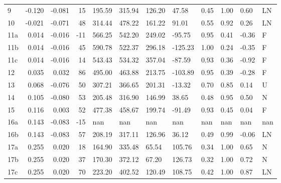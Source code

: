 \begin{tabular}{lrrrllllllll}
    9 & -0.120 & -0.081 &   15 &      195.59 &      315.94 &       126.20 &         47.58 &           0.45 &         1.00 &    0.60 &          LN \\
   10 & -0.021 & -0.071 &   48 &      314.44 &      478.22 &       161.22 &         91.01 &           0.55 &         0.92 &    0.26 &          LN \\
  11a &  0.014 & -0.016 &  -11 &      566.25 &      542.20 &       249.02 &        -95.75 &           0.95 &         0.41 &   -0.36 &           F \\
  11b &  0.014 & -0.016 &   45 &      590.78 &      522.37 &       296.18 &       -125.23 &           1.00 &         0.24 &   -0.35 &           F \\
  11c &  0.014 & -0.016 &   14 &      543.43 &      534.32 &       357.04 &        -87.59 &           0.93 &         0.36 &   -0.92 &           F \\
   12 &  0.035 &  0.032 &   86 &      495.00 &      463.88 &       213.75 &       -103.89 &           0.95 &         0.39 &   -0.28 &           F \\
   13 &  0.068 & -0.076 &   50 &      307.21 &      366.65 &       201.31 &        -13.32 &           0.70 &         0.85 &    0.14 &           U \\
   14 &  0.105 & -0.080 &   53 &      205.48 &      316.90 &       146.99 &         38.65 &           0.48 &         0.95 &    0.50 &           N \\
   15 &  0.116 &  0.003 &   52 &      477.38 &      458.67 &       199.74 &        -91.49 &           0.93 &         0.45 &    0.04 &           F \\
  16a &  0.143 & -0.083 &  -15 &         nan &         nan &          nan &           nan &            nan &          nan &     nan &         nan \\
  16b &  0.143 & -0.083 &   57 &      208.19 &      317.11 &       126.96 &         36.12 &           0.49 &         0.99 &   -0.06 &          LN \\
  17a &  0.255 &  0.020 &   18 &      164.90 &      335.48 &        65.54 &        105.76 &           0.34 &         1.00 &    0.65 &           N \\
  17b &  0.255 &  0.020 &   37 &      170.30 &      372.12 &        67.20 &        126.73 &           0.32 &         1.00 &    0.72 &           N \\
  17c &  0.255 &  0.020 &   70 &      223.20 &      402.52 &       120.49 &        108.75 &           0.42 &         1.00 &    0.87 &          LN \\

\end{tabular}
